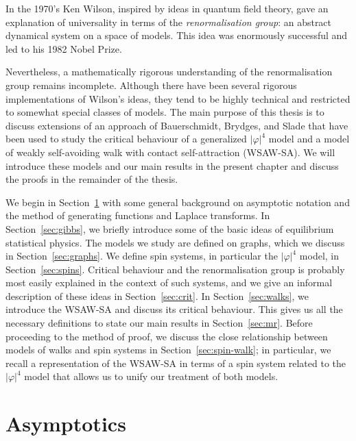 In the 1970's Ken Wilson, inspired by ideas in quantum field theory, gave an
explanation of universality in terms of the \emph{renormalisation group}:
an abstract dynamical system on a space of models. This idea was enormously successful
and led to his 1982 Nobel Prize.

Nevertheless, a mathematically rigorous understanding of the renormalisation group
remains incomplete. Although there have been several rigorous implementations of
Wilson's ideas, they tend to be highly technical and restricted to somewhat special
classes of models. The main purpose of this thesis is to discuss extensions of an
approach of Bauerschmidt, Brydges, and Slade that have been used to study the
critical behaviour of a generalized $|\varphi|^4$ model and a model of weakly
self-avoiding walk with contact self-attraction (WSAW-SA). We will introduce these
models and our main results in the present chapter and discuss the proofs in the
remainder of the thesis.

We begin in Section~\ref{sec:asymp} with some general background on asymptotic
notation and the method of generating functions and Laplace transforms. In
Section~\ref{sec:gibbs}, we briefly introduce some of the basic ideas of equilibrium
statistical physics. The models we study are defined on graphs, which we
discuss in Section~\ref{sec:graphs}. We define spin systems, in particular
the $|\varphi|^4$ model, in Section~\ref{sec:spins}. Critical behaviour and
the renormalisation group is probably most easily explained in the context of such
systems, and we give an informal description of these ideas in Section~\ref{sec:crit}.
In Section~\ref{sec:walks},
we introduce the WSAW-SA and discuss its critical behaviour. This gives us all
the necessary definitions to state our main results in Section~\ref{sec:mr}.
Before proceeding to the method of proof,
we discuss the close relationship between models of walks and spin systems in
Section~\ref{sec:spin-walk}; in particular, we recall a representation
of the WSAW-SA in terms of a spin system related to the $|\varphi|^4$ model
that allows us to unify our treatment of both models.


\section{Asymptotics}
\label{sec:asymp}

